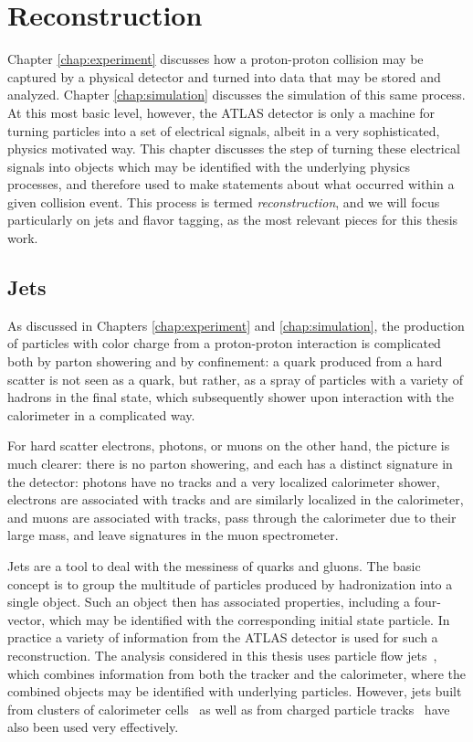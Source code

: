 \chapter{Reconstruction}
\label{chap:reconstruction}

Chapter \ref{chap:experiment} discusses how a proton-proton collision may be captured by a physical 
detector and turned into data that may be stored and analyzed. Chapter \ref{chap:simulation} discusses 
the simulation of this same process. At this most basic level, however, the ATLAS detector is only a machine 
for turning particles into a set of electrical signals, albeit in a very sophisticated, physics motivated way. 
This chapter discusses the step of turning these electrical signals into objects which may be identified 
with the underlying physics processes, and therefore used to make statements about what occurred within 
a given collision event. This process is termed \emph{reconstruction}, and we will focus particularly on jets and flavor tagging, as the most relevant pieces for this thesis work.

\section{Jets}
As discussed in Chapters \ref{chap:experiment} and \ref{chap:simulation}, the production of particles with color 
charge from a proton-proton interaction is complicated both by parton showering and by confinement: a quark produced 
from a hard scatter is not seen as a quark, but rather, as a spray of particles with a variety of hadrons in the final 
state, which subsequently shower upon interaction with the calorimeter in a complicated way. 

For hard scatter electrons, photons, or muons on the other hand, the picture is much clearer: there is no parton 
showering, and each has a distinct signature in the detector: photons have no tracks and a very localized calorimeter
shower, electrons are associated with tracks and are similarly localized in the calorimeter, and muons are associated 
with tracks, pass through the calorimeter due to their large mass, and leave signatures in the muon spectrometer.

Jets are a tool to deal with the messiness of quarks and gluons. The basic concept is to group the multitude of
particles produced by hadronization into a single object. Such an object then has associated properties, 
including a four-vector, which may be identified with the corresponding initial state particle. In practice a variety 
of information from the ATLAS detector is used for such a reconstruction. The analysis considered in this thesis uses 
particle flow jets~\cite{PERF-2015-09}, which combines information from both the tracker and the calorimeter, where the 
combined objects may be identified with underlying particles. However, jets built from clusters of calorimeter cells~\cite{PERF-2014-07} as well as from charged particle tracks~\cite{ATL-PHYS-PUB-2017-010} have also been used very effectively.

